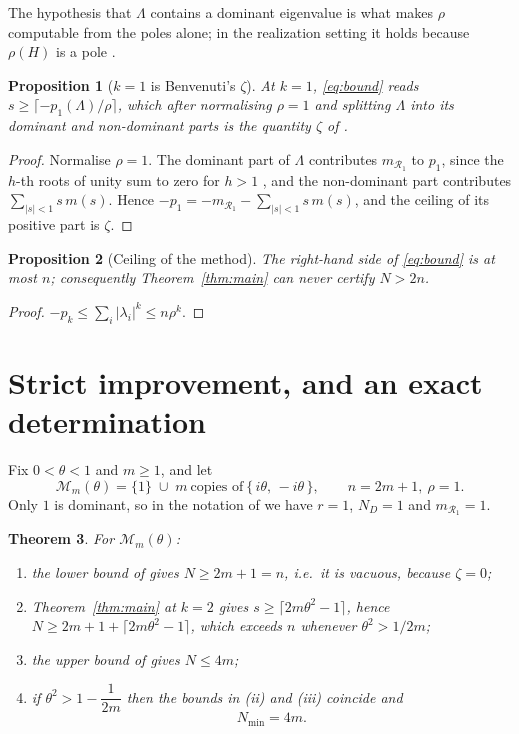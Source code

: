 \documentclass[11pt]{article}
\theoremstyle{plain}
\newtheorem{theorem}{Theorem}
\newtheorem{proposition}[theorem]{Proposition}
\theoremstyle{remark}
\newcommand{\M}{\mathcal{M}}
\begin{document}
The hypothesis that $\Lambda$ contains a dominant eigenvalue is what makes $\rho$ computable
from the poles alone; in the realization setting it holds because $\rho(H)$ is a pole
\cite[Lem.~7]{BF04}.

\begin{proposition}[$k=1$ is Benvenuti's $\zeta$]\label{prop:k1}
At $k=1$, \eqref{eq:bound} reads $s\ge\lceil-p_1(\Lambda)/\rho\rceil$, which after
normalising $\rho=1$ and splitting $\Lambda$ into its dominant and non-dominant parts is
the quantity $\zeta$ of {\rm\cite[Thm.~4.7]{Ben20ELA}}.
\end{proposition}

\begin{proof}
Normalise $\rho=1$. The dominant part of $\Lambda$ contributes $m_{\mathcal R_1}$ to
$p_1$, since the $h$-th roots of unity sum to zero for $h>1$
\cite[proof of Thm.~4.7]{Ben20ELA}, and the non-dominant part contributes
$\sum_{|s|<1}s\,m(s)$. Hence $-p_1=-m_{\mathcal R_1}-\sum_{|s|<1}s\,m(s)$, and the ceiling
of its positive part is $\zeta$.
\end{proof}

\begin{proposition}[Ceiling of the method]\label{prop:ceiling}
The right-hand side of \eqref{eq:bound} is at most $n$; consequently
Theorem~\ref{thm:main} can never certify $N>2n$.
\end{proposition}

\begin{proof}
$-p_k\le\sum_i|\lambda_i|^{k}\le n\rho^{k}$.
\end{proof}

\section{Strict improvement, and an exact determination}\label{sec:improve}

Fix $0<\theta<1$ and $m\ge1$, and let
\[
\M_m(\theta)=\{1\}\;\cup\;m\ \text{copies of}\ \{\,i\theta,\,-i\theta\,\},
\qquad n=2m+1,\ \rho=1 .
\]
Only $1$ is dominant, so in the notation of \cite{Ben20ELA} we have $r=1$,
$N_D=1$ and $m_{\mathcal R_1}=1$.

\begin{theorem}\label{thm:improve}
For $\M_m(\theta)$:
\begin{enumerate}
\item[(i)] the lower bound of {\rm\cite[Thm.~4.7]{Ben20ELA}} gives $N\ge 2m+1=n$, i.e.\ it is
vacuous, because $\zeta=0$;
\item[(ii)] Theorem~\ref{thm:main} at $k=2$ gives
$s\ge\lceil 2m\theta^{2}-1\rceil$, hence $N\ge 2m+1+\lceil2m\theta^{2}-1\rceil$, which
exceeds $n$ whenever $\theta^{2}>1/2m$;
\item[(iii)] the upper bound of {\rm\cite[Thm.~4.4]{Ben20ELA}} gives $N\le 4m$;
\item[(iv)] if $\theta^{2}>1-\dfrac{1}{2m}$ then the bounds in (ii) and (iii) coincide and
\[
N_{\min}=4m .
\]
\end{enumerate}
\end{theorem}
\end{document}
